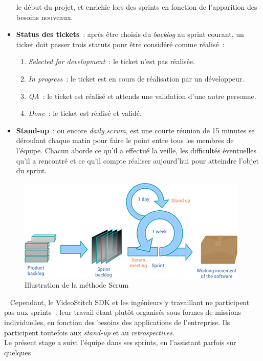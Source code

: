 \begin{itemize}
  le début du projet, et enrichie lors des sprints en fonction de l'apparition des besoins nouveaux.
  \item \textbf{Status des tickets}~: après être choisis du \textit{backlog} au sprint courant, 
  un ticket doit passer trois statuts pour être considéré comme réalisé~:
    \begin{enumerate}
      \item \textit{Selected for development}~: le ticket n'est pas réalisée.
      \item \textit{In progress}~: le ticket est en cours de réalisation par un développeur.
      \item \textit{QA}~: le ticket est réalisé et attends une validation d'une autre personne.
      \item \textit{Done}~: le ticket est réalisé et validé. 
    \end{enumerate}
  \item \textbf{Stand-up}~: \label{stand-up} ou encore \textit{daily scrum}, est une courte réunion de 15 minutes
  se déroulant chaque matin pour faire le point entre tous les membres de l'équipe.
  Chacun aborde ce qu'il a effectué la veille, les difficultés éventuelles qu'il
  a rencontré et ce qu'il compte réaliser aujourd'hui pour atteindre l'objet du sprint.
\end{itemize}
\begin{figure}
  \centering
  \includegraphics[width=11cm]{images/scrum-process.png}
  \caption{Illustration de la méthode Scrum\cite{scrum-process}}
\end{figure}
\ \newline
Cependant, le VideoStitch SDK et les ingénieurs y travaillant ne participent pas
aux sprints~: leur travail étant plutôt organisés sous formes de missions individuelles,
en fonction des besoins des applications de l'entreprise. Ils participent toutefois 
aux \textit{stand-up} et au \textit{retrospectives}.\\
Le présent stage a suivi l'équipe dans ses sprints, en l'assistant parfois sur quelques
